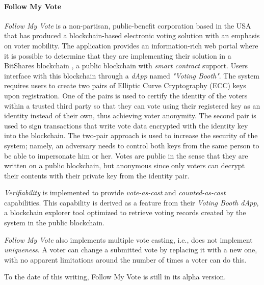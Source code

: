 \documentclass[../access.tex]{subfiles}
\begin{document}
\paragraph{Follow My Vote \cite{Ernest2021}}
\textit{Follow My Vote} is a non-partisan, public-benefit corporation based in the USA that has produced a blockchain-based electronic voting solution with an emphasis on voter mobility. The application provides an information-rich web portal \cite{Ernest2021} where it is possible to determine that they are implementing their solution in a BitShares blockchain \cite{BitShares2023}, a public blockchain with \textit{smart contract} support. Users interface with this blockchain through a \textit{dApp} named \textit{"Voting Booth"}. The system requires users to create two pairs of Elliptic Curve Cryptography (ECC) keys upon registration. One of the pairs is used to certify the identity of the voters within a trusted third party so that they can vote using their registered key as an identity instead of their own, thus achieving voter anonymity. The second pair is used to sign transactions that write vote data encrypted with the identity key into the blockchain. The two-pair approach is used to increase the security of the system; namely, an adversary needs to control both keys from the same person to be able to impersonate him or her. Votes are public in the sense that they are written on a public blockchain, but anonymous since only voters can decrypt their contents with their private key from the identity pair.
\par
\textit{Verifiability} is implemented to provide \textit{vote-as-cast} and \textit{counted-as-cast} capabilities. This capability is derived as a feature from their \textit{Voting Booth dApp}, a blockchain explorer tool optimized to retrieve voting records created by the system in the public blockchain.
\par
\textit{Follow My Vote} also implements multiple vote casting, i.e., does not implement \textit{uniqueness}. A voter can change a submitted vote by replacing it with a new one, with no apparent limitations around the number of times a voter can do this.
\par
To the date of this writing, Follow My Vote is still in its alpha version.
\end{document}
